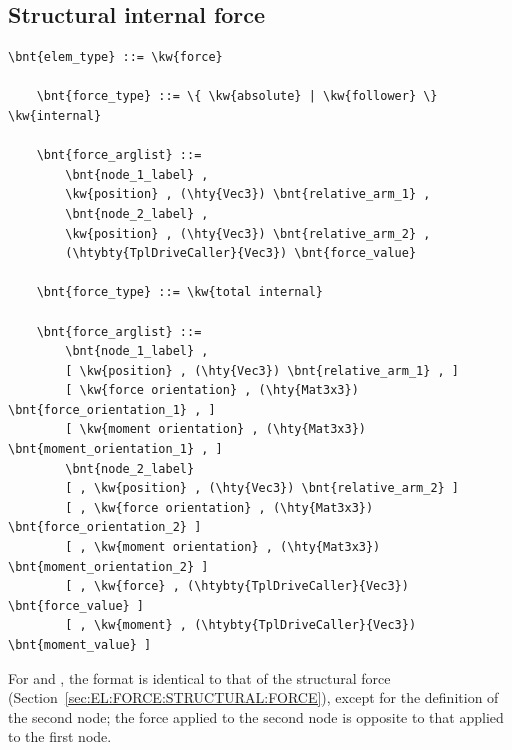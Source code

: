 \subsection{Structural internal force}
\label{sec:EL:FORCE:STRUCTURAL:INTERNAL_FORCE}
\begin{Verbatim}[commandchars=\\\{\}]
    \bnt{elem_type} ::= \kw{force}

    \bnt{force_type} ::= \{ \kw{absolute} | \kw{follower} \} \kw{internal}

    \bnt{force_arglist} ::=
        \bnt{node_1_label} , 
        \kw{position} , (\hty{Vec3}) \bnt{relative_arm_1} ,
        \bnt{node_2_label} ,
        \kw{position} , (\hty{Vec3}) \bnt{relative_arm_2} ,
        (\htybty{TplDriveCaller}{Vec3}) \bnt{force_value}

    \bnt{force_type} ::= \kw{total internal}

    \bnt{force_arglist} ::=
        \bnt{node_1_label} ,
        [ \kw{position} , (\hty{Vec3}) \bnt{relative_arm_1} , ]
        [ \kw{force orientation} , (\hty{Mat3x3}) \bnt{force_orientation_1} , ]
        [ \kw{moment orientation} , (\hty{Mat3x3}) \bnt{moment_orientation_1} , ]
        \bnt{node_2_label}
        [ , \kw{position} , (\hty{Vec3}) \bnt{relative_arm_2} ]
        [ , \kw{force orientation} , (\hty{Mat3x3}) \bnt{force_orientation_2} ]
        [ , \kw{moment orientation} , (\hty{Mat3x3}) \bnt{moment_orientation_2} ]
        [ , \kw{force} , (\htybty{TplDriveCaller}{Vec3}) \bnt{force_value} ]
        [ , \kw{moment} , (\htybty{TplDriveCaller}{Vec3}) \bnt{moment_value} ]
\end{Verbatim}

For  and ,
the format is identical to that of the structural force
(Section~\ref{sec:EL:FORCE:STRUCTURAL:FORCE}),
except for the definition of the second node;
the force applied to the second node is opposite
to that applied to the first node.

